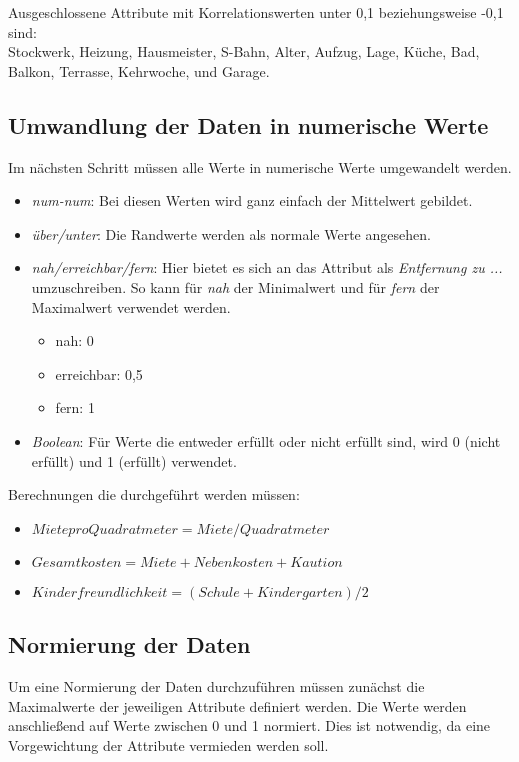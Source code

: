 Ausgeschlossene Attribute mit Korrelationswerten unter 0,1 beziehungsweise -0,1 sind:\\
Stockwerk, Heizung, Hausmeister, S-Bahn, Alter, Aufzug, Lage, Küche, Bad, Balkon, Terrasse, Kehrwoche, 
und Garage.

\subsection{Umwandlung der Daten in numerische Werte}
Im nächsten Schritt müssen alle Werte in numerische Werte umgewandelt werden. 
\begin{itemize}
    \item \textit{num-num}: Bei diesen Werten wird ganz einfach der Mittelwert gebildet. 
    \item \textit{über/unter}: Die Randwerte werden als normale Werte angesehen. 
    \item \textit{nah/erreichbar/fern}: Hier bietet es sich an das Attribut als \textit{Entfernung zu ...} umzuschreiben. 
                So kann für \textit{nah} der Minimalwert und für \textit{fern} der Maximalwert verwendet werden.
    \begin{itemize}
        \item nah: 0
        \item erreichbar: 0,5
        \item fern: 1
    \end{itemize}
    \item \textit{Boolean}: Für Werte die entweder erfüllt oder nicht erfüllt sind, wird 0 (nicht erfüllt) und 1 (erfüllt) verwendet.
\end{itemize}

Berechnungen die durchgeführt werden müssen: 
\begin{itemize}
    \item $Miete pro Quadratmeter = Miete/Quadratmeter$
    \item $Gesamtkosten = Miete + Nebenkosten + Kaution$
    \item $Kinderfreundlichkeit = (Schule + Kindergarten)/2$
\end{itemize}

\subsection{Normierung der Daten}
Um eine Normierung der Daten durchzuführen müssen zunächst die Maximalwerte der 
jeweiligen Attribute definiert werden. Die Werte werden anschließend auf Werte 
zwischen 0 und 1 normiert. Dies ist notwendig, da eine Vorgewichtung der Attribute
vermieden werden soll.

